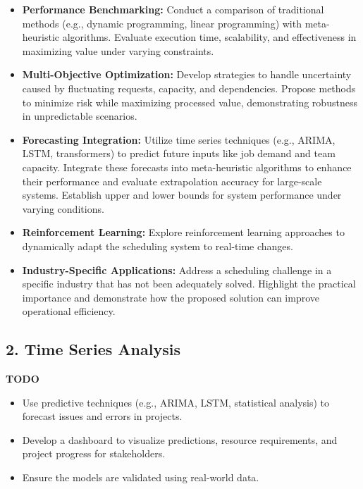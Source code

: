 \documentclass[12pt]{article}
\begin{document}
\begin{itemize} 

\item \textbf{Performance Benchmarking:} Conduct a comparison of traditional methods (e.g., dynamic programming, linear programming) with meta-heuristic algorithms. Evaluate execution time, scalability, and effectiveness in maximizing value under varying constraints.

\item \textbf{Multi-Objective Optimization:} Develop strategies to handle uncertainty caused by fluctuating requests, capacity, and dependencies. Propose methods to minimize risk while maximizing processed value, demonstrating robustness in unpredictable scenarios.

\item \textbf{Forecasting Integration:} Utilize time series techniques (e.g., ARIMA, LSTM, transformers) to predict future inputs like job demand and team capacity. Integrate these forecasts into meta-heuristic algorithms to enhance their performance and evaluate extrapolation accuracy for large-scale systems. Establish upper and lower bounds for system performance under varying conditions.

\item \textbf{Reinforcement Learning:} Explore reinforcement learning approaches to dynamically adapt the scheduling system to real-time changes. 

\item \textbf{Industry-Specific Applications:} Address a scheduling challenge in a specific industry that has not been adequately solved. Highlight the practical importance and demonstrate how the proposed solution can improve operational efficiency.
\end{itemize}

\subsection*{2. Time Series Analysis}

\textbf{TODO}

\begin{itemize}
    \item Use predictive techniques (e.g., ARIMA, LSTM, statistical analysis) to forecast issues and errors in projects.
    \item Develop a dashboard to visualize predictions, resource requirements, and project progress for stakeholders.
    \item Ensure the models are validated using real-world data.
\end{itemize}
\end{document}
